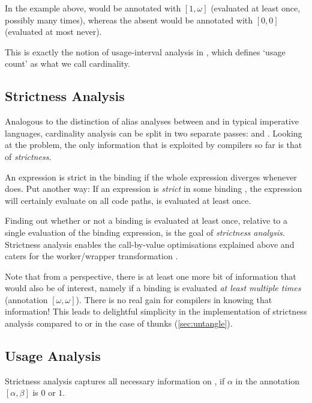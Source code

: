 In the example above,  would be annotated with $[1,\omega]$ (evaluated at least once, possibly many times), whereas the absent  would be annotated with $[0, 0]$ (evaluated at most never).

This is exactly the notion of usage-interval analysis in \textcite[chapter~5]{sestoft}, which defines `usage count' as what we call cardinality.

\subsection{Strictness Analysis}\label{sec:strict}

Analogous to the distinction of alias analyses between \MayAlias and \MustAlias in typical imperative languages, cardinality analysis can be split in two separate passes:
\MinCard and \MaxCard. Looking at the \MinCard problem, the only information that is exploited by compilers so far is that of \emph{strictness}.

An expression  is strict in the binding  if the whole expression diverges whenever  does.
Put another way: 
If an expression is \emph{strict} in some binding , the expression will certainly evaluate  on all code paths, \eg {} is evaluated at least once.

Finding out whether or not a binding is evaluated at least once, relative to a single evaluation of the binding expression, is the goal of \emph{strictness analysis}.
Strictness analysis enables the call-by-value optimisations explained above and caters for the worker/wrapper transformation \parencite{ww}.

Note that from a \MinCard perspective, there is at least one more bit of information that would also be of interest, namely if a binding is evaluated \emph{at least multiple times} (\eg annotation $[\omega,\omega]$).
There is no real gain for compilers in knowing that information!
This leads to delightful simplicity in the implementation of strictness analysis compared to \MinCard or \MaxCard in the case of thunks (\cf \cref{sec:untangle}).

\subsection{Usage Analysis}\label{sec:usage}

Strictness analysis captures all necessary information on \MinCard, \eg if $\alpha$ in the annotation $[\alpha,\beta]$ is $0$ or $1$.

